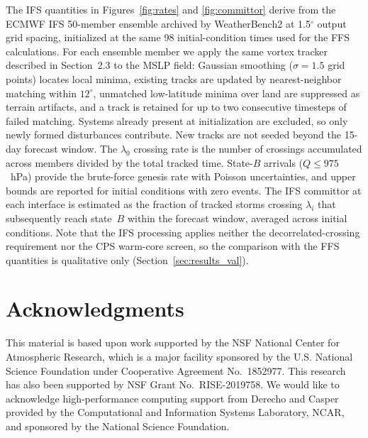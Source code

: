 \documentclass[11pt]{article}
\begin{document}
The IFS quantities in Figures~\ref{fig:rates} and \ref{fig:committor} derive from the
ECMWF IFS 50-member ensemble archived by WeatherBench2 \citep{rasp2024weatherbench2}
at 1.5$^\circ$ output grid spacing, initialized at the same 98 initial-condition times
used for the FFS calculations.
For each ensemble member we apply the same vortex tracker described in Section~2.3 to
the MSLP field: Gaussian smoothing ($\sigma = 1.5$ grid points) locates local minima,
existing tracks are updated by nearest-neighbor matching within $12^\circ$, unmatched
low-latitude minima over land are suppressed as terrain artifacts, and a track is
retained for up to two consecutive timesteps of failed matching.
Systems already present at initialization are excluded, so only newly formed
disturbances contribute. New tracks are not seeded beyond the 15-day forecast window.
The $\lambda_0$ crossing rate is the number of crossings accumulated across members
divided by the total tracked time.
State-$B$ arrivals ($Q \leq 975$~hPa) provide the brute-force genesis rate with
Poisson uncertainties, and upper bounds are reported for initial conditions with
zero events.
The IFS committor at each interface is estimated as the fraction of tracked storms
crossing $\lambda_i$ that subsequently reach state~$B$ within the forecast window,
averaged across initial conditions.
Note that the IFS processing applies neither the decorrelated-crossing requirement
nor the CPS warm-core screen, so the comparison with the FFS quantities is
qualitative only (Section~\ref{sec:results_val}).

\section*{Acknowledgments}
This material is based upon work supported by the NSF National Center for Atmospheric
Research, which is a major facility sponsored by the U.S. National Science Foundation
under Cooperative Agreement No.\ 1852977.
This research has also been supported by NSF Grant No.\ RISE-2019758.
We would like to acknowledge high-performance computing support from Derecho and Casper
\citep{Cheyenne} provided by the Computational and Information Systems Laboratory,
NCAR, and sponsored by the National Science Foundation.
\end{document}
